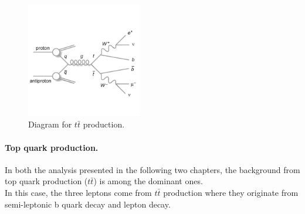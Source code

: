 \begin{figure}[h!]
\centering
 \includegraphics[clip,trim=0cm 3cm 0.2cm 3cm, width=0.45\textwidth]{Figures/c4/dia/tt.pdf}
  \caption{Diagram for $t\bar{t}$ production.~\cite{diagram}}
  \label{fig:c46}
\end{figure}

\paragraph{Top quark production.}\label{sec:c4ttbar}

In both the analysis presented in the following two chapters, the
background from top quark production ($t\bar{t}$) is among the
dominant ones. \\
In this case, the three leptons come from $t\bar{t}$ production 
where they originate from semi-leptonic b quark decay and lepton \PW decay.

\vspace{10mm}
